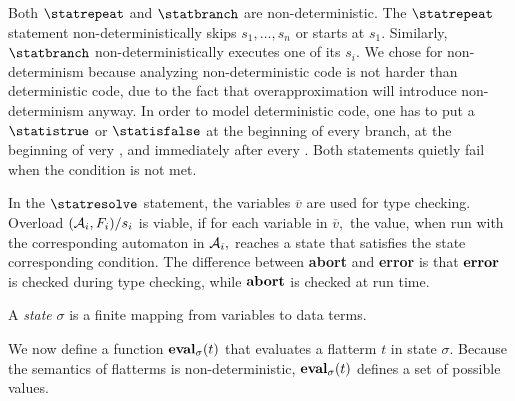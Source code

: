 \noindent
Both $ \statrepeat $ and $ \statbranch $ are non-deterministic.
The $ \statrepeat $ statement non-deterministically skips
$ s_1, \ldots, s_n $ or starts at $ s_1. $
Similarly, $ \statbranch $ non-deterministically executes one of its
$ s_i. $ We chose for non-determinism because analyzing
non-deterministic code is not harder than deterministic code,
due to the fact that overapproximation will introduce non-determinism anyway.
In order to model deterministic code, one has to put
a $ \statistrue $ or $ \statisfalse $ at the beginning of every branch,
at the beginning of very \statrepeat, and immediately after every
\statrepeat.
Both statements quietly fail when the condition is not met.

In the $ \statresolve $ statement, the variables $ \overline{v} $ are used
for type checking. Overload $ ( {\cal A}_i, F_i ) / s_i $ is viable,
if for each variable in $ \overline{v}, $ the value, when
run with the corresponding automaton in $ {\cal A}_i, $ reaches a state
that satisfies the state corresponding condition.
\noindent
The difference between {\bf abort} and {\bf error} is
that $ {\bf error} $ is checked during type checking,
while $ {\bf abort} $ is checked at run time.

\begin{definition}
   \label{Def_state}
   A \emph{state} $ \sigma $ is a finite mapping from variables to
   data terms.
\end{definition}

We now define a function $ {\bf eval}_{\sigma}(t) $
that evaluates a flatterm $ t $ in state $ \sigma. $
Because the semantics of flatterms is non-deterministic,
$ {\bf eval}_{\sigma}(t) $ defines a set of possible values.

